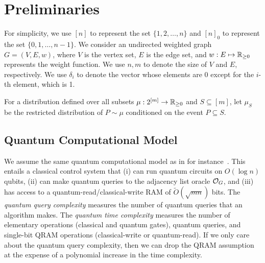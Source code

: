 \documentclass[11pt]{article}
\newcommand{\sqb}[1]{\left[ #1 \right]}
\newcommand{\sets}[1]{\{ #1 \}}
\begin{document}
{\section{Preliminaries}
For simplicity, 
we use $\sqb{n}$ to 
represent the set $\sets{1, 2, \ldots, n}$ and
$\sqb{n}_{0}$ to 
represent the set $\sets{0, 1, \ldots, n-1}$. 
We consider an
undirected weighted graph $G = (V, E, w)$, where $V$ is the vertex set, $E$ is
the edge set, and $w : E \mapsto \mathbb{R}_{\geq0}$ represents the weight function. We use
$n,m$ to denote the size of $V$ and $E$, respectively. We use
$\delta_i$ to denote the vector whose elements are 0 except for the $i$-th
element, which is 1.

For a distribution defined over all subsets $\mu: 2 ^{\sqb{m}}\to \RR_{\geq 0}$ and $S \subseteq \sqb{m}$, let $\mu_S$ be the restricted distribution of $P \sim \mu$ conditioned on the event $P \subseteq S$.


\subsection{Quantum Computational Model}

We assume the same quantum computational model as in for
instance~\cite{DHHM06,AdW22}.
This entails a classical control system that (i) can run quantum circuits on
$O(\log n)$ qubits, (ii) can make quantum queries to the adjacency list oracle
$\mathcal{O}_G$, and (iii) has access to a quantum-read/classical-write RAM of
$\widetilde O(\sqrt{mn})$ bits.
The \emph{quantum query complexity} measures the number of quantum queries that
an algorithm makes.
The \emph{quantum time complexity} measures the number of elementary operations
(classical and quantum gates), quantum queries, and single-bit QRAM operations
(classical-write or quantum-read).
If we only care about the quantum query complexity, then we can drop the QRAM
assumption at the expense of a polynomial increase in the time complexity.

}
\end{document}

